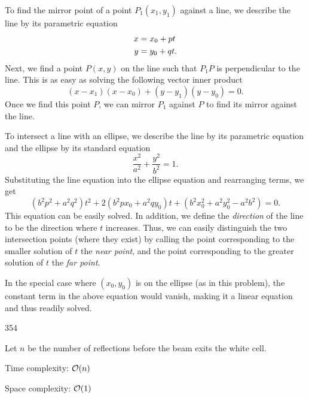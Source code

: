 To find the mirror point of a point $P_1(x_1,y_1)$ against a line, we describe the line by its parametric equation
\begin{align}
x &= x_0 + pt \notag \\
y &= y_0 + qt \notag .
\end{align}
Next, we find a point $P(x,y)$ on the line such that $P_1 P$ is perpendicular to the line. This is as easy as solving the following vector inner product
\[
(x-x_1)(x-x_0) + (y-y_1)(y-y_0) = 0 .
\]
Once we find this point $P$, we can mirror $P_1$ against $P$ to find its mirror against the line.

To intersect a line with an ellipse, we describe the line by its parametric equation and the ellipse by its standard equation
\[
\frac{x^2}{a^2} + \frac{y^2}{b^2} = 1 .
\]
Substituting the line equation into the ellipse equation and rearranging terms, we get
\[
(b^2 p^2 + a^2 q^2) t^2 + 2(b^2 p x_0 + a^2 q y_0) t + (b^2 x_0^2 + a^2 y_0^2 - a^2 b^2) = 0 .
\]
This equation can be easily solved. In addition, we define the \emph{direction} of the line to be the direction where $t$ increases. Thus, we can easily distinguish the two intersection points (where they exist) by calling the point corresponding to the smaller solution of $t$ the \emph{near point}, and the point corresponding to the greater solution of $t$ the \emph{far point}.

In the special case where $(x_0, y_0)$ is on the ellipse (as in this problem), the constant term in the above equation would vanish, making it a linear equation and thus readily solved.

\answer

354

\complexity

Let $n$ be the number of reflections before the beam exits the white cell.

Time complexity: $\mathcal{O}(n)$

Space complexity: $\mathcal{O}(1)$


